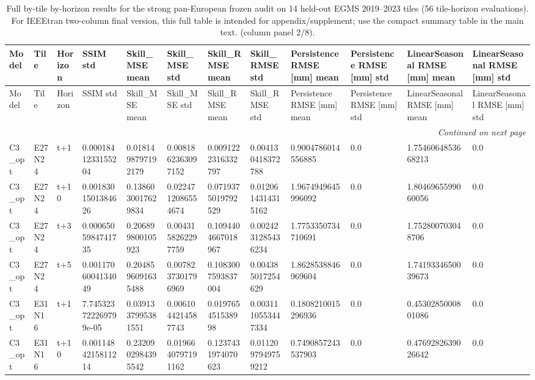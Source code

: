 \begin{landscape}
\scriptsize
\setlength{\LTleft}{0pt}
\setlength{\LTright}{0pt}
\begin{longtable}{llllllllllll}
\caption{Full by-tile by-horizon results for the strong pan-European frozen audit on 14 held-out EGMS 2019--2023 tiles (56 tile-horizon evaluations). For IEEEtran two-column final version, this full table is intended for appendix/supplement; use the compact summary table in the main text. (column panel 2/8).}\label{tab:e7_strong_by_tile_full_part2}\\
\toprule
Model & Tile & Horizon & SSIM std & Skill\_MSE mean & Skill\_MSE std & Skill\_RMSE mean & Skill\_RMSE std & Persistence RMSE [mm] mean & Persistence RMSE [mm] std & LinearSeasonal RMSE [mm] mean & LinearSeasonal RMSE [mm] std \\
\midrule
\endfirsthead
\toprule
Model & Tile & Horizon & SSIM std & Skill\_MSE mean & Skill\_MSE std & Skill\_RMSE mean & Skill\_RMSE std & Persistence RMSE [mm] mean & Persistence RMSE [mm] std & LinearSeasonal RMSE [mm] mean & LinearSeasonal RMSE [mm] std \\
\midrule
\endhead
\midrule
\multicolumn{12}{r}{\textit{Continued on next page}} \\
\endfoot
\bottomrule
\endlastfoot
C3\_opt & E27N24 & t+1 & 0.0001841233155204 & 0.0181498797192179 & 0.0081862363097152 & 0.0091222316332797 & 0.004130418372788 & 0.9004786014556885 & 0.0 & 1.7546064853668213 & 0.0 \\
C3\_opt & E27N24 & t+10 & 0.0018301501384626 & 0.1386030017629834 & 0.0224712086554674 & 0.0719375019792529 & 0.0120614314315162 & 1.9674949645996092 & 0.0 & 1.8046965599060056 & 0.0 \\
C3\_opt & E27N24 & t+3 & 0.0006505984741735 & 0.206899800105923 & 0.0043158262297759 & 0.1094404667018967 & 0.0024231285436234 & 1.7753350734710691 & 0.0 & 1.752800703048706 & 0.0 \\
C3\_opt & E27N24 & t+5 & 0.0011706004134049 & 0.2048596091635488 & 0.0078237301796969 & 0.1083007593837004 & 0.004385017254629 & 1.8628538846969604 & 0.0 & 1.7419334650039673 & 0.0 \\
C3\_opt & E31N16 & t+1 & 7.745323722269799e-05 & 0.0391337995381551 & 0.0061044214587743 & 0.019765451538998 & 0.0031110553447334 & 0.1808210015296936 & 0.0 & 0.4530285000801086 & 0.0 \\
C3\_opt & E31N16 & t+10 & 0.0011484215811214 & 0.2320902984395542 & 0.0196640797191162 & 0.1237431974070623 & 0.0112097949759212 & 0.7490857243537903 & 0.0 & 0.4769282639026642 & 0.0 \\

\end{longtable}
\end{landscape}
